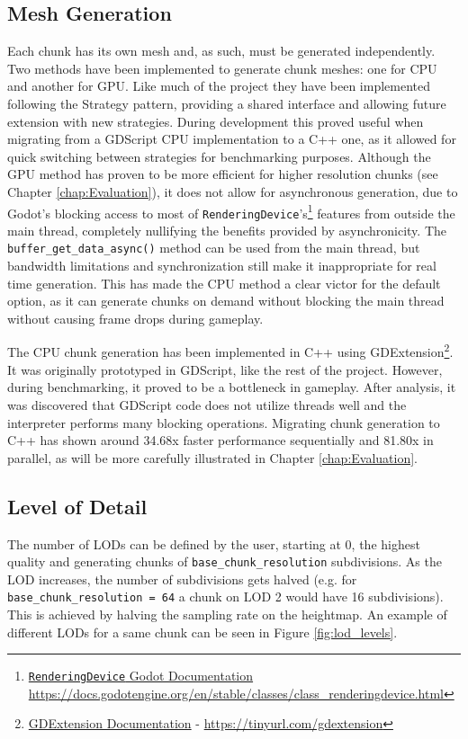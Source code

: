 \subsection{Mesh Generation}
Each chunk has its own mesh and, as such, must be generated independently. Two methods have been implemented to generate chunk meshes: one for CPU and another for GPU.
Like much of the project they have been implemented following the Strategy pattern, providing a shared interface and allowing future extension with new strategies.
During development this proved useful when migrating from a GDScript CPU implementation to a C++ one, as it allowed for quick switching between strategies for benchmarking purposes.
Although the GPU method has proven to be more efficient for higher resolution chunks (see Chapter \ref{chap:Evaluation}), it does not allow for asynchronous generation, due to Godot's blocking access to most of \texttt{RenderingDevice}'s\footnote{\href{https://docs.godotengine.org/en/stable/classes/class_renderingdevice.html}{\texttt{RenderingDevice} Godot Documentation}\\ \hspace*{1.9em}\url{https://docs.godotengine.org/en/stable/classes/class_renderingdevice.html}} features from outside the main thread, completely nullifying the benefits provided by asynchronicity.
The \texttt{buffer\_get\_data\_async()} method can be used from the main thread, but bandwidth limitations and synchronization still make it inappropriate for real time generation.
This has made the CPU method a clear victor for the default option, as it can generate chunks on demand without blocking the main thread without causing frame drops during gameplay.

The CPU chunk generation has been implemented in C++ using GDExtension\footnote{\href{https://docs.godotengine.org/en/4.x/tutorials/scripting/gdextension/index.html}{GDExtension Documentation} - \url{https://tinyurl.com/gdextension}}.
It was originally prototyped in GDScript, like the rest of the project.
However, during benchmarking, it proved to be a bottleneck in gameplay.
After analysis, it was discovered that GDScript code does not utilize threads well and the interpreter performs many blocking operations.
Migrating chunk generation to C++ has shown around 34.68x faster performance sequentially and 81.80x in parallel, as will be more carefully illustrated in Chapter \ref{chap:Evaluation}.

\subsection{Level of Detail}
The number of LODs can be defined by the user, starting at 0, the highest quality and generating chunks of \texttt{base\_chunk\_resolution} subdivisions.
As the LOD increases, the number of subdivisions gets halved (e.g. for \texttt{base\_chunk\_resolution = 64} a chunk on LOD 2 would have 16 subdivisions).
This is achieved by halving the sampling rate on the heightmap.
An example of different LODs for a same chunk can be seen in Figure \ref{fig:lod_levels}.


